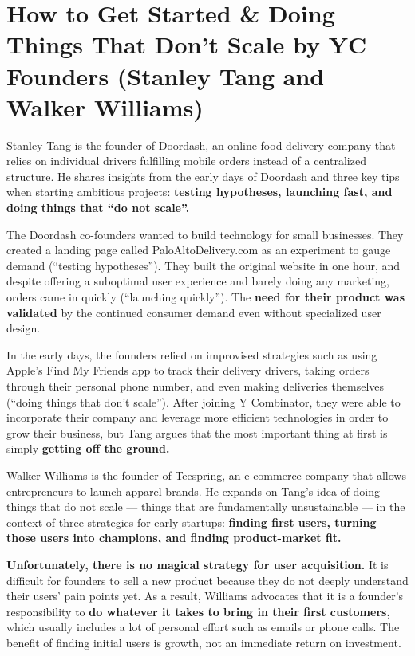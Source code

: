 
\section{How to Get Started \& Doing Things That Don't Scale by YC Founders (Stanley Tang and Walker Williams)}
\label{sec:getting_started_yc}

Stanley Tang is the founder of Doordash, an online food delivery company that relies on individual drivers fulfilling mobile orders instead of a centralized structure.
He shares insights from the early days of Doordash and three key tips when starting ambitious projects: \textbf{testing hypotheses, launching fast, and doing things that ``do not scale''.}

The Doordash co-founders wanted to build technology for small businesses.
They created a landing page called PaloAltoDelivery.com as an experiment to gauge demand (``testing hypotheses'').
They built the original website in one hour, and despite offering a suboptimal user experience and barely doing any marketing, orders came in quickly (``launching quickly'').
The \textbf{need for their product was validated} by the continued consumer demand even without specialized user design.

In the early days, the founders relied on improvised strategies such as using Apple's Find My Friends app to track their delivery drivers, taking orders through their personal phone number, and even making deliveries themselves (``doing things that don't scale'').
After joining Y Combinator, they were able to incorporate their company and leverage more efficient technologies in order to grow their business, but Tang argues that the most important thing at first is simply \textbf{getting off the ground.}

Walker Williams is the founder of Teespring, an e-commerce company that allows entrepreneurs to launch apparel brands.
He expands on Tang's idea of doing things that do not scale --- things that are fundamentally unsustainable --- in the context of three strategies for early startups: \textbf{finding first users, turning those users into champions, and finding product-market fit.}

\textbf{Unfortunately, there is no magical strategy for user acquisition.}
It is difficult for founders to sell a new product because they do not deeply understand their users' pain points yet.
As a result, Williams advocates that it is a founder's responsibility to \textbf{do whatever it takes to bring in their first customers,} which usually includes a lot of personal effort such as emails or phone calls.
The benefit of finding initial users is growth, not an immediate return on investment.

